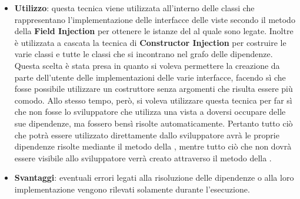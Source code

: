 \begin{itemize}
	\item \textbf{Utilizzo}: questa tecnica viene utilizzata all'interno delle classi che rappresentano l'implementazione delle interfacce delle viste secondo il metodo della \textbf{Field Injection} per ottenere le istanze del  al quale sono legate. Inoltre è utilizzata a cascata la tecnica di \textbf{Constructor Injection} per costruire le varie classi  e tutte le classi che si incontrano nel grafo delle dipendenze.
	Questa scelta è stata presa in quanto si voleva permettere la creazione da parte dell'utente delle implementazioni delle varie interfacce, facendo sì che fosse possibile utilizzare un costruttore senza argomenti che risulta essere più comodo. Allo stesso tempo, però, si voleva utilizzare questa tecnica per far sì che non fosse lo sviluppatore che utilizza una vista a doversi occupare delle sue dipendenze, ma fossero bensì risolte automaticamente. Pertanto tutto ciò che potrà essere utilizzato direttamente dallo sviluppatore avrà le proprie dipendenze risolte mediante il metodo della , mentre tutto ciò che non dovrà essere visibile allo sviluppatore verrà creato attraverso il metodo della .
	\item \textbf{Svantaggi}: eventuali errori legati alla risoluzione delle dipendenze o alla loro
implementazione vengono rilevati solamente durante l'esecuzione.
\end{itemize}